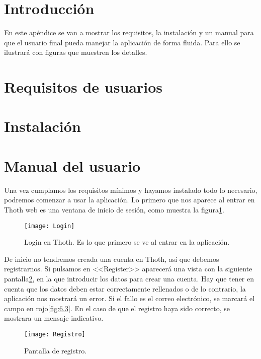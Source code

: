 
\section{Introducción}

En este apéndice se van a mostrar los requisitos, la instalación y un manual para que el usuario final pueda manejar la aplicación de forma fluida. Para ello se ilustrará con figuras que muestren los detalles.

\section{Requisitos de usuarios}


\section{Instalación}

\section{Manual del usuario}

Una vez cumplamos los requisitos mínimos y hayamos instalado todo lo necesario, podremos comenzar a usar la aplicación. Lo primero que nos aparece al entrar en Thoth web es una ventana de inicio de sesión, como muestra la figura\ref{fig:6.1}.


\begin{figure}[h]
\centering
\texttt{[image: Login]}
\caption{Login en Thoth. Es lo que primero se ve al entrar en la aplicación.}
\label{fig:6.1}
\end{figure}

De inicio no tendremos creada una cuenta en Thoth, así que debemos registrarnos. Si pulsamos en <<Register>> aparecerá una vista con la siguiente pantalla\ref{fig:6.2}, en la que introducir los datos para crear una cuenta. Hay que tener en cuenta que los datos deben estar correctamente rellenados o de lo contrario, la aplicación nos mostrará un error. Si el fallo es el correo electrónico, se marcará el campo en rojo\ref{fig:6.3}. En el caso de que el registro haya sido correcto, se mostrara un mensaje indicativo.

\begin{figure}[h]
\centering
\texttt{[image: Registro]}
\caption{Pantalla de registro.}
\label{fig:6.2}
\end{figure}

